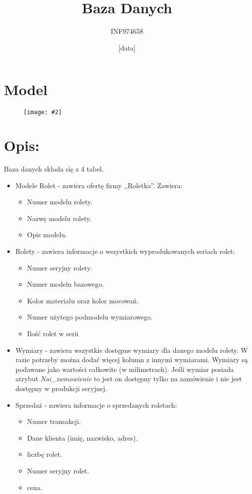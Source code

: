 \documentclass[a4paper,12pt]{article}
\title{Baza Danych}
\author{INF974658}
\date{[data]}
\newcommand{\obrazek}[2]{
	\begin{figure}[h]
		\centering
		\texttt{[image: \#2]}
	\end{figure}
}
\begin{document}
\section{Model}

\obrazek{0.24}{model}

\section{Opis:}

Baza danych składa się z 4 tabel.
\begin{itemize}
		\item Modele Rolet - zawiera ofertę firmy ,,Roletka''. Zawiera:
				\begin{itemize}
						\item Numer modelu rolety.
						\item Nazwę modelu rolety.
						\item Opis modelu.
				\end{itemize}
		\item Rolety - zawiera informacje o wszystkich wyprodukowanych seriach rolet:
				\begin{itemize}
						\item Numer seryjny rolety.
						\item Numer modelu bazowego.
						\item Kolor materiału oraz kolor mocowań.
						\item Numer użytego podmodelu wymiarowego.
						\item Ilość rolet w serii
				\end{itemize}
		\item Wymiary - zawiera wszystkie dostępne wymiary dla danego modelu rolety. W razie potrzeby
				można dodać więcej kolumn z innymi wymiarami. Wymiary są podawane jako wartości całkowite
				(w milimetrach). Jeśli wymiar posiada atrybut \emph{Nai\_zwmowienie} to jest on dostępny tylko
				na zamówienie i nie jest dostępny w produkcji seryjnej.
		\item Sprzedaż - zawiera informacje o sprzedanych roletach:
				\begin{itemize}
						\item Numer transakcji.
						\item Dane klienta (imię, nazwisko, adres).
						\item liczbę rolet.
						\item Numer seryjny rolet.
						\item cena.
				\end{itemize}
\end{itemize}
\end{document}
